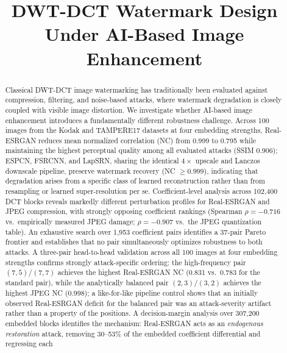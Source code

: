 \documentclass[conference]{IEEEtran}
\begin{document}
\title{DWT-DCT Watermark Design Under AI-Based Image Enhancement}

\author{
}

\maketitle

\begin{abstract}
Classical DWT-DCT image watermarking has traditionally been evaluated
against compression, filtering, and noise-based attacks, where watermark
degradation is closely coupled with visible image distortion. We
investigate whether AI-based image enhancement introduces a fundamentally
different robustness challenge. Across 100 images from the Kodak and
TAMPERE17 datasets at four embedding strengths, Real-ESRGAN reduces mean
normalized correlation (NC) from 0.999 to 0.795 while maintaining the
highest perceptual quality among all evaluated attacks (SSIM 0.906);
ESPCN, FSRCNN, and LapSRN, sharing the identical $4\times$ upscale and
Lanczos downscale pipeline, preserve watermark recovery
(NC $\geq 0.999$), indicating that degradation arises from a specific
class of learned reconstruction rather than from resampling or learned
super-resolution per se. Coefficient-level analysis across 102,400 DCT blocks reveals
markedly different perturbation profiles for Real-ESRGAN and JPEG
compression, with strongly opposing coefficient rankings (Spearman
$\rho = -0.716$ vs.\ empirically measured JPEG damage; $\rho = -0.907$
vs.\ the JPEG quantization table). An exhaustive search over 1,953
coefficient pairs identifies a 37-pair Pareto frontier and establishes
that no pair simultaneously optimizes robustness to both attacks. A
three-pair head-to-head validation across all 100 images at four
embedding strengths confirms strongly attack-specific ordering: the
high-frequency pair $(7,5)/(7,7)$ achieves the highest Real-ESRGAN NC
(0.831 vs.\ 0.783 for the standard pair), while the analytically
balanced pair $(2,3)/(3,2)$ achieves the highest JPEG NC (0.998); a
like-for-like pipeline control shows that an initially observed
Real-ESRGAN deficit for the balanced pair was an attack-severity
artifact rather than a property of the positions. A decision-margin
analysis over 307,200 embedded blocks identifies the mechanism:
Real-ESRGAN acts as an \emph{endogenous restoration} attack, removing
30--53\% of the embedded coefficient differential and regressing each

\end{abstract}
\end{document}
